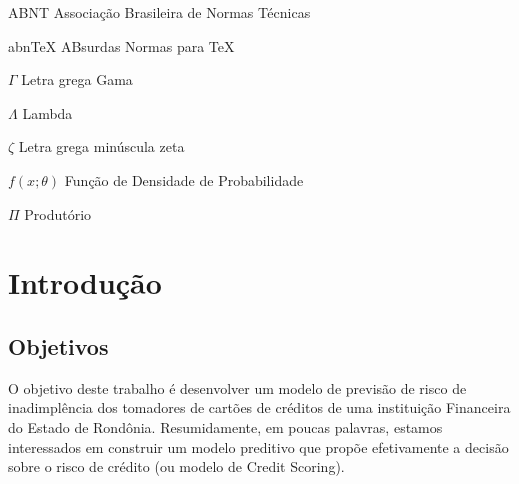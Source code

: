 \documentclass[
	12pt,				%
	openright,			%
	oneside,      %
	a4paper,			%
	english,			%
	french,				%
	spanish,			%
	brazil,				%
	]{abntex2}\usepackage[]{graphicx}\usepackage[]{xcolor}
\begin{document}
\listoffigures*
\cleardoublepage

\listoftables*
\cleardoublepage

\begin{siglas}
  \item[ABNT] Associação Brasileira de Normas Técnicas
  \item[abnTeX] ABsurdas Normas para TeX
\end{siglas}

\begin{simbolos}
  \item[$ \Gamma $] Letra grega Gama
  \item[$ \Lambda $] Lambda
  \item[$ \zeta $] Letra grega minúscula zeta
  \item[$ f(x;\theta)$] Função de Densidade de Probabilidade
  \item[$ \Pi $] Produtório
\end{simbolos}

\tableofcontents*
\cleardoublepage

\textual

\chapter[Introdução]{Introdução}



  \section{Objetivos}

O objetivo deste trabalho é desenvolver um modelo de previsão de risco de inadimplência 
dos tomadores de cartões de créditos de uma instituição Financeira do Estado de Rondônia.
Resumidamente, em poucas palavras, estamos interessados em construir um modelo preditivo
que propõe efetivamente a decisão sobre o risco de crédito (ou modelo de Credit Scoring).
\end{document}
